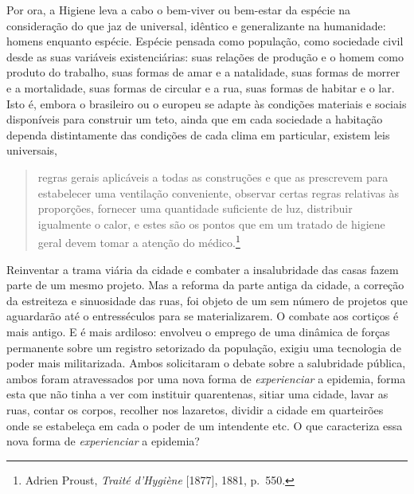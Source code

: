 Por ora, a Higiene leva a cabo o bem-viver ou bem-estar da espécie na
consideração do que jaz de universal, idêntico e generalizante na
humanidade: homens enquanto espécie. Espécie pensada como população,
como sociedade civil desde as suas variáveis existenciárias: suas
relações de produção e o homem como produto do trabalho, suas formas de
amar e a natalidade, suas formas de morrer e a mortalidade, suas formas
de circular e a rua, suas formas de habitar e o lar. Isto é, embora o
brasileiro ou o europeu se adapte às condições materiais e sociais
disponíveis para construir um teto, ainda que em cada sociedade a
habitação dependa distintamente das condições de cada clima em
particular, existem leis universais,

\begin{quote}
regras gerais aplicáveis a todas as construções e que as prescrevem para
estabelecer uma ventilação conveniente, observar certas regras relativas
às proporções, fornecer uma quantidade suficiente de luz, distribuir
igualmente o calor, e estes são os pontos que em um tratado de higiene
geral devem tomar a atenção do médico.\footnote{Adrien Proust,
  \textit{Traité d'Hygiène} {[}1877{]}, 1881, p.~550.}
\end{quote}

Reinventar a trama viária da cidade e combater a insalubridade das casas
fazem parte de um mesmo projeto. Mas a reforma da parte antiga da
cidade, a correção da estreiteza e sinuosidade das ruas, foi objeto de
um sem número de projetos que aguardarão até o entresséculos para se
materializarem. O combate aos cortiços é mais antigo. E é mais ardiloso:
envolveu o emprego de uma dinâmica de forças permanente sobre um
registro setorizado da população, exigiu uma tecnologia de poder mais
militarizada. Ambos solicitaram o debate sobre a salubridade pública,
ambos foram atravessados por uma nova forma de \textit{experienciar} a
epidemia, forma esta que não tinha a ver com instituir quarentenas,
sitiar uma cidade, lavar as ruas, contar os corpos, recolher nos
lazaretos, dividir a cidade em quarteirões onde se estabeleça em cada o
poder de um intendente etc. O que caracteriza essa nova forma de
\textit{experienciar} a epidemia?

